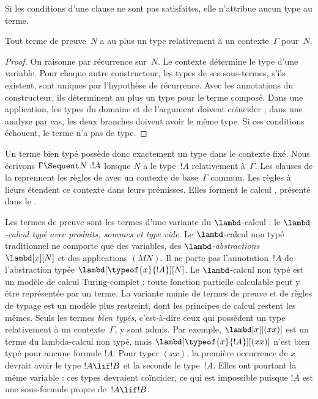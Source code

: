 \documentclass[../../../include/open-logic-section]{subfiles}
\begin{document}
Si les conditions d'une clause ne sont pas satisfaites,
elle n'attribue aucun type au terme.

\begin{prop}
Tout terme de preuve~$N$ a au plus un type relativement
à un contexte~$\Gamma$ pour~$N$.
\end{prop}

\begin{proof}
On raisonne par récurrence sur~$N$.
Le contexte détermine le type d'une variable.
Pour chaque autre constructeur, les types de ses sous-termes,
s'ils existent, sont uniques par l'hypothèse de récurrence.
Avec les annotations du constructeur, ils déterminent
au plus un type pour le terme composé.
Dans une application, les types du domaine et de l'argument
doivent coïncider ; dans une analyse par cas, les deux branches
doivent avoir le même type. Si ces conditions échouent,
le terme n'a pas de type.
\end{proof}

Un terme bien typé possède donc exactement un type dans
le contexte fixé. Nous écrivons $\Gamma \Sequent N : !A$
lorsque $N$ a le type~$!A$ relativement à~$\Gamma$.
Les clauses de la  reprennent les règles
de  avec un contexte de base~$\Gamma$ commun.
Les règles à lieurs étendent ce contexte dans leurs prémisses.
Elles forment le calcul , présenté dans le
.



Les termes de preuve sont les termes d'une variante du
$\lambd$-calcul : le \emph{$\lambd$-calcul typé avec produits,
sommes et type vide}. Le $\lambd$-calcul non typé traditionnel
ne comporte que des variables, des
\emph{$\lambd$-abstractions}~$\lambd[x][N]$ et des applications
$(MN)$. Il ne porte pas l'annotation~$!A$ de l'abstraction
typée $\lambd[\typeof{x}{!A}][N]$.
Le $\lambd$-calcul non typé est un modèle de calcul
Turing-complet : toute fonction partielle calculable
peut y être représentée par un terme.
La variante munie de termes de preuve et de règles de typage
est un modèle plus restreint, dont les principes de calcul
restent les mêmes. Seuls les termes \emph{bien typés},
c'est-à-dire ceux qui possèdent un type relativement
à un contexte~$\Gamma$, y sont admis.
Par exemple, $\lambd[x][(xx)]$ est un terme du lambda-calcul
non typé, mais $\lambd[\typeof{x}{!A}][(xx)]$ n'est bien typé
pour aucune formule $!A$.
Pour typer $(xx)$, la première occurrence de $x$
devrait avoir le type $!A \lif !B$ et la seconde le type~$!A$.
Elles ont pourtant la même variable : ces types devraient
coïncider, ce qui est impossible puisque $!A$ est une
sous-formule propre de~$!A \lif !B$.
\end{document}
